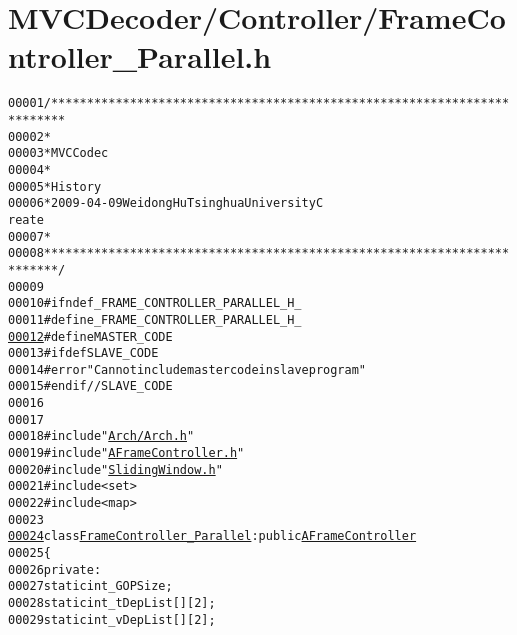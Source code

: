 \hypertarget{_frame_controller___parallel_8h_source}{
\section{MVCDecoder/Controller/FrameController\_\-Parallel.h}
}


\begin{footnotesize}\begin{alltt}
00001 \textcolor{comment}{/************************************************************************}
00002 \textcolor{comment}{ *}
00003 \textcolor{comment}{ * MVC Codec}
00004 \textcolor{comment}{ * }
00005 \textcolor{comment}{ * History}
00006 \textcolor{comment}{ * 2009-04-09           Weidong Hu              Tsinghua University             C
      reate}
00007 \textcolor{comment}{ * }
00008 \textcolor{comment}{ ************************************************************************/}
00009 
00010 \textcolor{preprocessor}{#ifndef \_FRAME\_CONTROLLER\_PARALLEL\_H\_}
00011 \textcolor{preprocessor}{}\textcolor{preprocessor}{#define \_FRAME\_CONTROLLER\_PARALLEL\_H\_}
\hypertarget{_frame_controller___parallel_8h_source_l00012}{}\hyperlink{_frame_controller___parallel_8h_aac0db9a0280340fa820b89366c85d392}{00012} \textcolor{preprocessor}{}\textcolor{preprocessor}{#define MASTER\_CODE}
00013 \textcolor{preprocessor}{}\textcolor{preprocessor}{#ifdef SLAVE\_CODE}
00014 \textcolor{preprocessor}{}\textcolor{preprocessor}{#error "Can not include master code in slave program"}
00015 \textcolor{preprocessor}{}\textcolor{preprocessor}{#endif // SLAVE\_CODE}
00016 \textcolor{preprocessor}{}
00017 
00018 \textcolor{preprocessor}{#include "\hyperlink{_arch_8h}{Arch/Arch.h}"}
00019 \textcolor{preprocessor}{#include "\hyperlink{_a_frame_controller_8h}{AFrameController.h}"}
00020 \textcolor{preprocessor}{#include "\hyperlink{_sliding_window_8h}{SlidingWindow.h}"}
00021 \textcolor{preprocessor}{#include <set>}
00022 \textcolor{preprocessor}{#include <map>}
00023 
\hypertarget{_frame_controller___parallel_8h_source_l00024}{}\hyperlink{class_frame_controller___parallel}{00024} \textcolor{keyword}{class }\hyperlink{class_frame_controller___parallel}{FrameController_Parallel} : \textcolor{keyword}{public} \hyperlink{class_a_frame_controller}{AFrameController}
00025 \{
00026 \textcolor{keyword}{private}:
00027         \textcolor{keyword}{static} \textcolor{keywordtype}{int} \_GOPSize;
00028         \textcolor{keyword}{static} \textcolor{keywordtype}{int} \_tDepList[][2];
00029         \textcolor{keyword}{static} \textcolor{keywordtype}{int} \_vDepList[][2];

\end{alltt}
\end{footnotesize}
